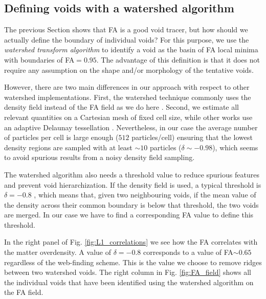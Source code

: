 \documentclass[a4,useAMS,usenatbib,usegraphicx]{mn2e}
\begin{document}
\subsection{Defining voids with a watershed algorithm}
\label{subsec:watershed}


The previous Section shows that FA is a good void tracer, but how
should we actually define the boundary of individual voids?
For this purpose, we use the \textit{watershed transform algorithm}
\citep{Beucher79,Beucher93} to identify a void as the basin of FA
local minima with boundaries of FA$=0.95$. 
The advantage of this definition is that it does not require any
assumption on the shape and/or morphology of the tentative voids. 

However, there are two main differences in our approach with respect to other
watershed implementations.
First, the watershed technique commonly uses the density field
instead of the FA field as we do here
\citep{Platen07,Neyrinck08}.   
Second, we estimate all relevant quantities on a Cartesian mesh of
fixed cell size, while other works use an adaptive Delaunay tessellation
\citep{Schaap00}.
Nevertheless, in our case the average number of particles per cell
  is large enough ($512$ particles/cell) ensuring that the lowest
  density regions are sampled with at least $\sim 10$ particles
  ($\delta \sim-0.98$), which seems to avoid spurious results from a
  noisy density field sampling.


The watershed algorithm also needs a threshold value to reduce
spurious features and prevent void hierarchization.  
If the density field is used, a typical threshold is
$\delta = -0.8$ \citep{Platen07},  which means that, given two neighbouring 
voids, if the mean value of the density across their common boundary is 
below that threshold, the two voids are merged.
In our case we have to find a corresponding FA value
to define this threshold.


In the right panel of Fig. \ref{fig:L1_correlations} we see how 
the FA correlates with the matter overdensity. 
A value of $\delta=-0.8$ corresponds to a value of FA$\sim 0.65$
regardless of the web-finding scheme. 
This is the value we choose to remove ridges between two watershed
voids. 
The right column in Fig. \ref{fig:FA_field} shows all the individual
voids that have been identified using the watershed algorithm on the
FA field.
\end{document}
